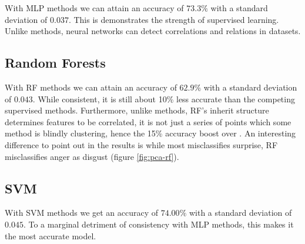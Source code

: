 
With MLP methods we can attain an accuracy of $73.3\%$ with a standard deviation of $0.037$. This is demonstrates the strength of supervised learning. Unlike \knn methods, neural networks can detect correlations and relations in datasets.

\subsection{Random Forests}


With RF methods we can attain an accuracy of $62.9\%$ with a standard deviation of $0.043$. While consistent, it is still about 10\% less accurate than the competing supervised methods. Furthermore, unlike \knn methods, RF's inherit structure determines features to be correlated, it is not just a series of points which some method is blindly clustering, hence the 15\% accuracy boost over \knn. An interesting difference to point out in the results is while \knn most misclassifies surprise, RF misclassifies anger as disgust (figure \ref{fig:pca-rf}).

\subsection{SVM}


With SVM methods we get an accuracy of $74.00\%$ with a standard deviation of $0.045$. To a marginal detriment of consistency with MLP methods, this makes it the most accurate model.